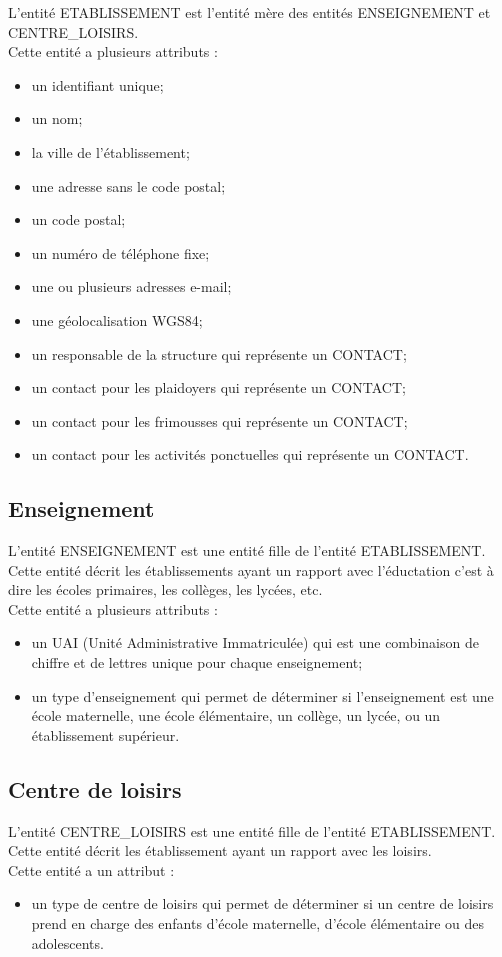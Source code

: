 \documentclass[asi, sansVersion]{picINSA}
\begin{document}
L'entité ETABLISSEMENT est l'entité mère des entités ENSEIGNEMENT et CENTRE\_LOISIRS. \\
Cette entité a plusieurs attributs : 
\begin{itemize}
\item un identifiant unique;
\item un nom;
\item la ville de l'établissement;
\item une adresse sans le code postal;
\item un code postal;
\item un numéro de téléphone fixe;
\item une ou plusieurs adresses e-mail; %
\item une géolocalisation WGS84; %
\item un responsable de la structure qui représente un CONTACT; %
\item un contact pour les plaidoyers qui représente un CONTACT; %
\item un contact pour les frimousses qui représente un CONTACT; %
\item un contact pour les activités ponctuelles qui représente un CONTACT. %
\end{itemize}

\subsection*{Enseignement}
L'entité ENSEIGNEMENT est une entité fille de l'entité ETABLISSEMENT. Cette entité décrit les établissements ayant un rapport avec l'éductation c'est à dire les écoles primaires, les collèges, les lycées, etc. \\
Cette entité a plusieurs attributs : 
\begin{itemize}
\item un UAI (Unité Administrative Immatriculée) qui est une combinaison de chiffre et de lettres unique pour chaque enseignement;
\item un type d'enseignement qui permet de déterminer si l'enseignement est une école maternelle, une école élémentaire, un collège, un lycée, ou un établissement supérieur. 
\end{itemize} 


\subsection*{Centre de loisirs}
L'entité CENTRE\_LOISIRS est une entité fille de l'entité ETABLISSEMENT. Cette entité décrit les établissement ayant un rapport avec les loisirs. \\
Cette entité a un attribut : 
\begin{itemize}
\item un type de centre de loisirs qui permet de déterminer si un centre de loisirs prend en charge des enfants d'école maternelle, d'école élémentaire ou des adolescents.
\end{itemize}  
\end{document}

